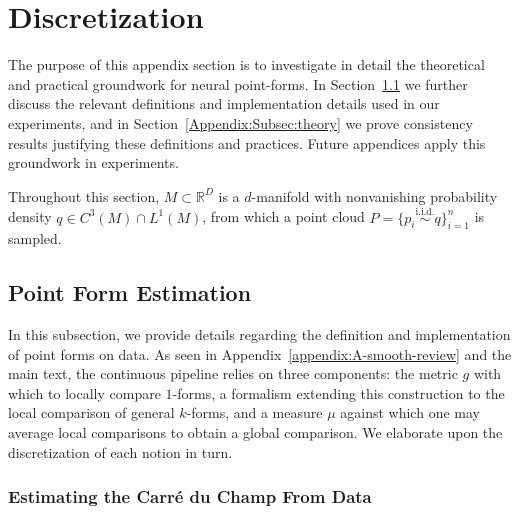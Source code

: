 \documentclass{article}
\theoremstyle{remark}
\theoremstyle{plain}
\begin{document}



\section{Discretization}
\label{appendix:B}

The purpose of this appendix section is to investigate in detail the theoretical and practical groundwork for neural point-forms. In Section~\ref{Appendix:subsec:discrete-kfcs} we further discuss the relevant definitions and implementation details used in our experiments, and in Section~\ref{Appendix:Subsec:theory} we prove consistency results justifying these definitions and practices. Future appendices apply this groundwork in experiments.

Throughout this section, $M \subset \mathbb{R}^{D}$ is a \( d \)-manifold with nonvanishing probability density $q \in C^3(M) \cap L^1(M)$, from which a point cloud $P=\{ p_{i} \overset{\text{i.i.d.}}{\sim} q \}_{i=1}^n$ is sampled.

\subsection{Point Form Estimation}
\label{Appendix:subsec:discrete-kfcs}
\label{appendix:B1}

In this subsection, we provide details regarding the definition and implementation of point forms on data. As seen in Appendix~\ref{appendix:A-smooth-review} and the main text, the continuous pipeline relies on three components: the metric \( g \) with which to locally compare \( 1 \)-forms, a formalism extending this construction to the local comparison of general \( k \)-forms, and a measure \( \mu \) against which one may average local comparisons to obtain a global comparison. We elaborate upon the discretization of each notion in turn. 



\subsubsection{Estimating the Carré du Champ From Data}
\label{subsubsec:cdc-estimation-from-data-including-variable-bandwidth-laplacian-contruction}
\end{document}
